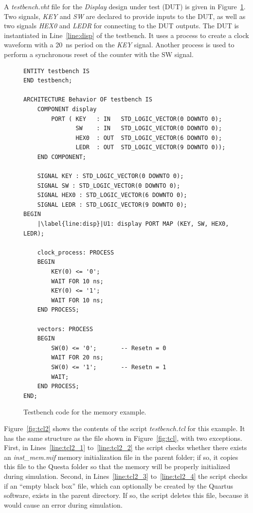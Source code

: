 \documentclass[11pt, twoside, pdftex]{article}
\begin{document}
\newpage
\noindent
A {\it testbench.vht} file for the {\it Display} design under test (DUT) is given in 
Figure~\ref{fig:tb3}. Two signals, {\it KEY} and {\it SW} are declared to provide 
inputs to the DUT, as well as two signals {\it HEX0} and {\it LEDR}
for connecting to the DUT outputs. The DUT is instantiated in Line~\ref{line:disp} of 
the testbench. It 
uses a process to create a clock waveform with a 20~ns period on the {\it KEY} signal.  Another 
process is used to perform a synchronous reset of the counter with the SW signal. 

\lstset{language=VHDL,numbers=left,escapechar=|}
\begin{figure}[h]
\begin{center}
\begin{minipage}[t]{12.5 cm}
\begin{lstlisting}[name=testbench3]
ENTITY testbench IS
END testbench;
 
ARCHITECTURE Behavior OF testbench IS
    COMPONENT display
        PORT ( KEY   : IN   STD_LOGIC_VECTOR(0 DOWNTO 0);
               SW    : IN   STD_LOGIC_VECTOR(0 DOWNTO 0);
               HEX0  : OUT  STD_LOGIC_VECTOR(6 DOWNTO 0);
               LEDR  : OUT  STD_LOGIC_VECTOR(9 DOWNTO 0));
    END COMPONENT;

    SIGNAL KEY : STD_LOGIC_VECTOR(0 DOWNTO 0);
    SIGNAL SW : STD_LOGIC_VECTOR(0 DOWNTO 0);
    SIGNAL HEX0 : STD_LOGIC_VECTOR(6 DOWNTO 0);
    SIGNAL LEDR : STD_LOGIC_VECTOR(9 DOWNTO 0);
BEGIN
    |\label{line:disp}|U1: display PORT MAP (KEY, SW, HEX0, LEDR);

    clock_process: PROCESS
    BEGIN
        KEY(0) <= '0';
        WAIT FOR 10 ns;
        KEY(0) <= '1';
        WAIT FOR 10 ns;
    END PROCESS;    
    
    vectors: PROCESS
    BEGIN
        SW(0) <= '0';       -- Resetn = 0
        WAIT FOR 20 ns;     
        SW(0) <= '1';       -- Resetn = 1
        WAIT;
    END PROCESS;
END;
\end{lstlisting}
\end{minipage}
\caption{Testbench code for the memory example.}
\label{fig:tb3}
\end{center}
\end{figure}

\noindent
Figure~\ref{fig:tcl2} shows the contents of the script {\it testbench.tcl} for this example.
It has the same structure as the file shown in Figure~\ref{fig:tcl}, with two exceptions. 
First, in Lines~\ref{line:tcl2_1} to~\ref{line:tcl2_2} the script checks whether there 
exists an {\it inst\_mem.mif} memory initialization file in the parent folder; if so, 
it copies this file to the Questa folder so that the memory will be properly initialized
during simulation. Second, in Lines~\ref{line:tcl2_3} 
to~\ref{line:tcl2_4} the script checks if an ``empty black box'' file, which can 
optionally be created by the Quartus software, exists in the parent directory. 
If so, the script deletes this file, because it would cause an error during simulation.
\end{document}
